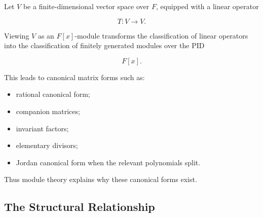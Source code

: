 Let \(V\) be a finite-dimensional vector space over \(F\), equipped with a
linear operator

\[ T:V\to V. \]

Viewing \(V\) as an \(F[x]\)-module transforms the classification of linear
operators into the classification of finitely generated modules over the PID

\[ F[x]. \]

This leads to canonical matrix forms such as:

\begin{itemize}
    \item rational canonical form;
    \item companion matrices;
    \item invariant factors;
    \item elementary divisors;
    \item Jordan canonical form when the relevant polynomials split.
\end{itemize}

Thus module theory explains why these canonical forms exist.

\subsection{The Structural Relationship}
\label{subsec:module-linear-operator-structure}

\begin{center}
\end{center}

